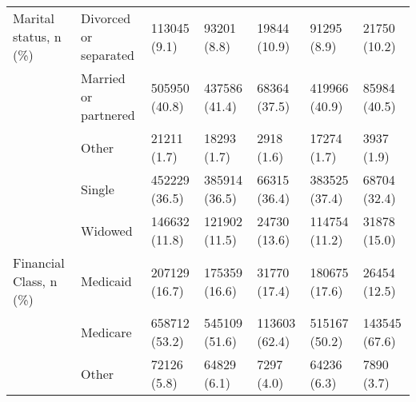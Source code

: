 \begin{tabular}{L{20em}C{10em}C{10em}C{10em}C{10em}C{10em}}
                             Marital status, n (\%) &               \hspace{3mm} Divorced or separated &       113045 (9.1) &                             93201 (8.8) &                        19844 (10.9) &                              91295 (8.9) &                        21750 (10.2) \\
                                                   &                \hspace{3mm} Married or partnered &      505950 (40.8) &                           437586 (41.4) &                        68364 (37.5) &                            419966 (40.9) &                        85984 (40.5) \\
                                                   &                               \hspace{3mm} Other &        21211 (1.7) &                             18293 (1.7) &                          2918 (1.6) &                              17274 (1.7) &                          3937 (1.9) \\
                                                   &                              \hspace{3mm} Single &      452229 (36.5) &                           385914 (36.5) &                        66315 (36.4) &                            383525 (37.4) &                        68704 (32.4) \\
                                                   &                             \hspace{3mm} Widowed &      146632 (11.8) &                           121902 (11.5) &                        24730 (13.6) &                            114754 (11.2) &                        31878 (15.0) \\
                            Financial Class, n (\%) &                            \hspace{3mm} Medicaid &      207129 (16.7) &                           175359 (16.6) &                        31770 (17.4) &                            180675 (17.6) &                        26454 (12.5) \\
                                                   &                            \hspace{3mm} Medicare &      658712 (53.2) &                           545109 (51.6) &                       113603 (62.4) &                            515167 (50.2) &                       143545 (67.6) \\
                                                   &                               \hspace{3mm} Other &        72126 (5.8) &                             64829 (6.1) &                          7297 (4.0) &                              64236 (6.3) &                          7890 (3.7) \\

\end{tabular}
